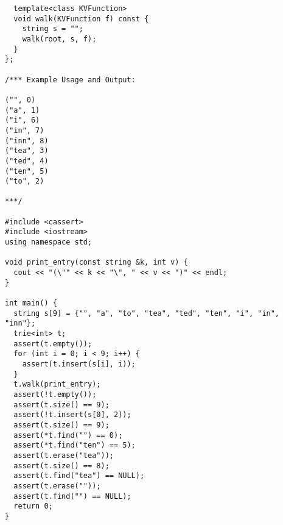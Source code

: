 \begin{lstlisting}
  template<class KVFunction>
  void walk(KVFunction f) const {
    string s = "";
    walk(root, s, f);
  }
};

/*** Example Usage and Output:

("", 0)
("a", 1)
("i", 6)
("in", 7)
("inn", 8)
("tea", 3)
("ted", 4)
("ten", 5)
("to", 2)

***/

#include <cassert>
#include <iostream>
using namespace std;

void print_entry(const string &k, int v) {
  cout << "(\"" << k << "\", " << v << ")" << endl;
}

int main() {
  string s[9] = {"", "a", "to", "tea", "ted", "ten", "i", "in", "inn"};
  trie<int> t;
  assert(t.empty());
  for (int i = 0; i < 9; i++) {
    assert(t.insert(s[i], i));
  }
  t.walk(print_entry);
  assert(!t.empty());
  assert(t.size() == 9);
  assert(!t.insert(s[0], 2));
  assert(t.size() == 9);
  assert(*t.find("") == 0);
  assert(*t.find("ten") == 5);
  assert(t.erase("tea"));
  assert(t.size() == 8);
  assert(t.find("tea") == NULL);
  assert(t.erase(""));
  assert(t.find("") == NULL);
  return 0;
}
\end{lstlisting}
